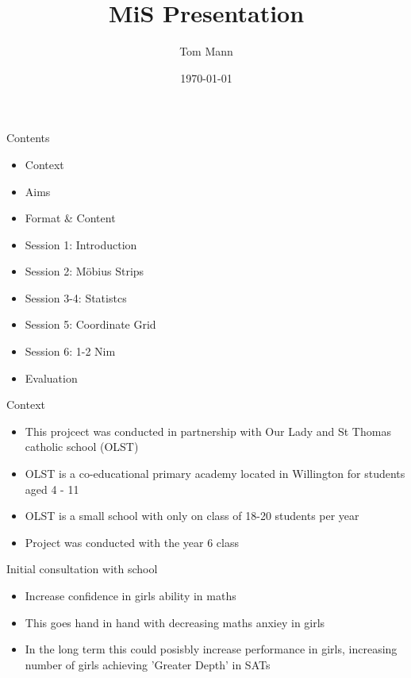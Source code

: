 \documentclass{beamer}  %
\title{MiS Presentation}
\author{Tom Mann}
\date{\today}
\begin{document}
\begin{frame}
    \titlepage
\end{frame}

\begin{frame}{Contents}
    \begin{itemize}
        \item Context
        \item Aims
        \item Format \& Content
        \item Session 1: Introduction
        \item Session 2: M\"{o}bius Strips
        \item Session 3-4: Statistcs
        \item Session 5: Coordinate Grid
        \item Session 6: 1-2 Nim
        \item Evaluation
    \end{itemize}
\end{frame}

\begin{frame}{Context}
    \begin{itemize}
        \item This projcect was conducted in partnership with Our Lady and St Thomas catholic school (OLST)
        \item OLST is a co-educational primary academy located in Willington for students aged 4 - 11
        \item OLST is a small school with only on class of 18-20 students per year
        \item Project was conducted with the year 6 class
    \end{itemize}
\end{frame}

\begin{frame}{Initial consultation with school}
    \begin{itemize}
        \item Increase confidence in girls ability in maths
        \item This goes hand in hand with decreasing maths anxiey in girls
        \item In the long term this could posisbly increase performance in girls, increasing number of girls achieving 'Greater Depth' in SATs
    \end{itemize}
\end{frame}
\end{document}
